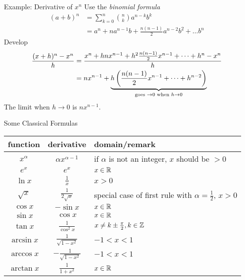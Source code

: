 \documentclass[8pt,dvipsnames]{beamer}
\begin{document}
\begin{frame}{Example: Derivative of $x^n$}
  Use the \emph{binomial formula}
  \begin{align*}
    (a + b)^n &= \sum_{k=0}^n {n\choose k}a^{n-k}b^k  \\
    &=a^n + n a^{n-1} b + \frac{n(n-1)}{2}a^{n-2}b^2 + \dots b^n
  \end{align*}
  Develop
  \begin{align*}
    \frac{(x+h)^n - x^n}{h} &= \frac{x^n + h nx^{n-1} + h^2\frac{n(n-1)}{2}x^{n-1} + \dots + h^n - x^n}{h}\\
    &= nx^{n-1} + \underset{\text{goes }\to 0\text{ when }h\to 0}{\underbrace{h\left(\frac{n(n-1)}{2}x^{n-1} + \dots + h^{n-2}\right)}}
  \end{align*}
  The limit when $h\to 0$ is $nx^{n-1}$.
\end{frame}

\begin{frame}{Some Classical Formulas}
\renewcommand{\arraystretch}{1.5}
  \begin{tabular}{|c|c|l|}
    \hline
    function & derivative & domain/remark \\\hline
    $x^\alpha$ & $\alpha x^{\alpha -1}$ & if $\alpha$ is not an integer, $x$ should be $> 0$\\
    \hline
    $e^x$ & $e^x$& $x\in {\mathbb R}$\\
    \hline
    $\ln x$ &$\frac1x$ & $x > 0$\\
    \hline
    $\sqrt{x}$ & $\frac1{2\sqrt{x}}$ & special case of first rule with $\alpha = \frac12$, $x>0$\\
    \hline
    $\cos x$ & $-\sin x$ &$x\in {\mathbb R}$\\
    \hline
    $\sin x$ & $\cos x$ & $x\in {\mathbb R}$\\
    \hline
    $\tan x$ & $\frac1{\cos^2 x}$ &  $x\not= k\pm\frac\pi2,k\in {\mathbb Z}$\\
    \hline
    $\arcsin x$ & $\frac1{\sqrt{1-x^2}}$ & $-1<x<1$\\
    \hline
    $\arccos x$ & $-\frac1{\sqrt{1-x^2}}$ & $-1<x<1$\\
    \hline
    $\arctan x$ & $\frac1{1+x^2}$ &$x\in {\mathbb R}$\\
    \hline
  \end{tabular}
\end{frame}
\end{document}

